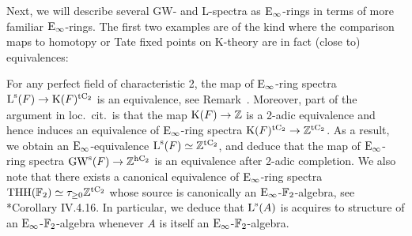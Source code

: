 Next, we will describe several GW- and L-spectra as ${\mathrm{E}_{\infty}}$-rings in terms of more familiar ${\mathrm{E}_{\infty}}$-rings. The first two examples are of the kind where the comparison maps to homotopy or Tate fixed points on K-theory are in fact (close to) equivalences:

\begin{example}
\label{example:perfect-fields-of-characteristic-2}%
For any perfect field of characteristic 2, the map of ${\mathrm{E}_{\infty}}$-ring spectra $\operatorname L^{\mathrm{s}}(F) \to \operatorname K(F)^{{\mathrm{t}\mathrm{C_2}}}$ is an equivalence, see Remark~. Moreover, part of the argument in loc.\ cit.\ is that the map $\operatorname K(F) \to \mathbb{Z}$ is a 2-adic equivalence and hence induces an equivalence of ${\mathrm{E}_{\infty}}$-ring spectra $\operatorname K(F)^{{\mathrm{t}\mathrm{C_2}}} \to \mathbb{Z}^{{\mathrm{t}\mathrm{C_2}}}$. As a result, we obtain an ${\mathrm{E}_{\infty}}$-equivalence $\operatorname L^{\mathrm{s}}(F) \simeq \mathbb{Z}^{{\mathrm{t}\mathrm{C_2}}}$, and deduce that the map of ${\mathrm{E}_{\infty}}$-ring spectra $\operatorname{GW}^{\mathrm{s}}(F) \to \mathbb{Z}^{{\mathrm{h}\mathrm{C_2}}}$ is an equivalence after 2-adic completion. We also note that there exists a canonical equivalence of ${\mathrm{E}_{\infty}}$-ring spectra $\mathrm{THH}(\mathbb{F}_2) \simeq \tau_{\geq0}\mathbb{Z}^{{\mathrm{t}\mathrm{C_2}}}$ whose source is canonically an ${\mathrm{E}_{\infty}}$-$\mathbb{F}_2$-algebra, see \cite{NS}*{Corollary IV.4.16}. In particular, we deduce that $\operatorname L^{\mathrm{s}}(A)$ is acquires to structure of an ${\mathrm{E}_{\infty}}$-$\mathbb{F}_2$-algebra whenever $A$ is itself an ${\mathrm{E}_{\infty}}$-$\mathbb{F}_2$-algebra.
\end{example}

